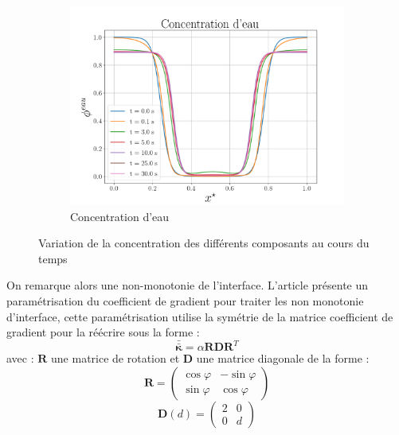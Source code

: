 \begin{figure}[H]
	\centering
	\ContinuedFloat
	\begin{subfigure}[H]{0.45\textwidth}
		\centering
		\includegraphics[width=\textwidth]{figure/nouveau_parametrage/eau_New_Parametrage.png}
		\caption{Concentration d'eau}
	\end{subfigure}
	\caption{Variation de la concentration des différents composants au cours du temps}
\end{figure}
On remarque alors une non-monotonie de l'interface. L'article \cite{rasolofomanana_diffuse-interface_2022} présente un paramétrisation du coefficient de gradient pour traiter les non monotonie d'interface, cette paramétrisation utilise la symétrie de la matrice coefficient de gradient pour la réécrire sous la forme :
\begin{equation}
\bar{\bar{\bm{\kappa}}} = \alpha \bm{R}\bm{D}\bm{R}^T
\label{eq:param_kappa}
\end{equation}
avec : $\bm{R}$ une matrice de rotation et $\bm{D}$ une matrice diagonale de la forme :
\begin{equation}
\bm{R} =    \begin{pmatrix} 
\cos\varphi & -\sin\varphi \\ 
\sin\varphi				&  \cos\varphi
\end{pmatrix}
\end{equation}
\begin{equation}
	\bm{D}(d) =    \begin{pmatrix} 
	2 & 0 \\ 
	0 & d
	\end{pmatrix} 
\end{equation}
